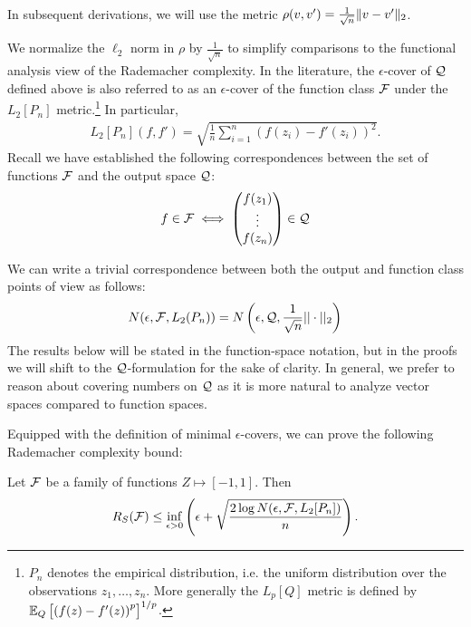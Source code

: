 In subsequent derivations, we will use the metric $\rho(v,v') = \frac 1 {\sqrt{n}} \|v-v'\|_2$. 

\begin{remark}
We normalize the $\ell_2$ norm in $\rho$ by $\frac{1}{\sqrt{n}}$ to simplify comparisons to the functional analysis view of the Rademacher complexity. In the literature, the $\epsilon$-cover of $\mathcal Q$ defined above is also referred to as an $\epsilon$-cover of the function class $\mathcal F$ under the $L_2[P_n]$ metric.\footnote{$P_n$ denotes the empirical distribution, i.e. the uniform distribution over the observations $z_1,\dots,z_n$. More generally the $L_p[Q]$ metric is defined by $\operatorname*{\mathbb{E}}_Q \left [\left (f(z) - f'(z) \right )^p \right]^{1/p}$.} 
In particular, 
\begin{align}
L_2[P_n](f,f') = \sqrt{ \frac 1 n \sum_{i=1}^n (f(z_i) - f'(z_i))^2 }.
\end{align}
Recall we have established the following correspondences between the set of functions $\mathcal F$ and the output space $\mathcal Q$:
\begin{align}
    f \in \mathcal F \iff \begin{pmatrix} f(z_1) \\ \vdots \\ f(z_n) \end{pmatrix} \in \mathcal Q
\end{align}

We can write a trivial correspondence between both the output and function class points of view as follows:
\begin{align}
N(\epsilon, \mathcal F, L_2(P_n)) = N\left (\epsilon, \mathcal Q, \frac{1}{\sqrt{n}} || \cdot ||_2 \right )
\end{align}
The results below will be stated in the function-space notation, but in the proofs we will shift to the $\mathcal Q$-formulation for the sake of clarity.
In general, we prefer to reason about covering numbers on $\mathcal Q$ as it is more natural to analyze vector spaces compared to function spaces.
\label{lec8:rmk:l2pncover}
\end{remark}

Equipped with the definition of minimal $\epsilon$-covers, we can prove the following Rademacher complexity bound:

\begin{theorem}\label{lec8:thm:rc-covering-bd}
Let $\mathcal F$ be a family of functions $Z \mapsto [-1,1]$. Then
\begin{equation}
R_S(\mathcal F) \le \inf_{\epsilon > 0} \left( \epsilon + \sqrt{ \frac {2\log N(\epsilon, \mathcal F, L_2[P_n])} n } \right). \label{lec8:eqn:rc-covering-bd}
\end{equation}
\end{theorem}

